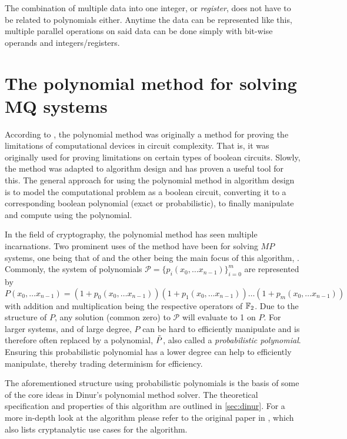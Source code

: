 The combination of multiple data into one integer, or \textit{register}, does not have to be related to polynomials either. Anytime the data can be represented like this, multiple parallel operations on said data can be done simply with bit-wise operands and integers/registers.

\section{The polynomial method for solving MQ systems} \label{sec:prereq:polymethod}
According to \cite{Williams2014ThePM}, the polynomial method was originally a method for proving the limitations of computational devices in circuit complexity. That is, it was originally used for proving limitations on certain types of boolean circuits. Slowly, the method was adapted to algorithm design and has proven a useful tool for this. The general approach for using the polynomial method in algorithm design is to model the computational problem as a boolean circuit, converting it to a corresponding boolean polynomial (exact or probabilistic), to finally manipulate and compute using the polynomial. 

In the field of cryptography, the polynomial method has seen multiple incarnations. Two prominent uses of the method have been for solving $MP$ systems, one being that of \cite{doi:10.1137/1.9781611974782.143} and the other being the main focus of this algorithm, \cite{eurocrypt-2021-30841}. Commonly, the system of polynomials $\mathcal{P} = \{p_i(x_0, \dots x_{n - 1})\}_{i = 0}^m$ are represented by 
$$
    P(x_0, \dots x_{n - 1}) = (1 + p_0(x_0, \dots x_{n - 1}))(1 + p_1(x_0, \dots x_{n - 1})) \dots (1 + p_m(x_0, \dots x_{n - 1}))
$$
with addition and multiplication being the respective operators of $\mathbb{F}_2$. Due to the structure of $P$, any solution (common zero) to $\mathcal{P}$ will evaluate to 1 on $P$. For larger systems, and of large degree, $P$ can be hard to efficiently manipulate and is therefore often replaced by a polynomial, $\Tilde{P}$, also called a \textit{probabilistic polynomial}. Ensuring this probabilistic polynomial has a lower degree can help to efficiently manipulate, thereby trading determinism for efficiency.

The aforementioned structure using probabilistic polynomials is the basis of some of the core ideas in Dinur's polynomial method solver. The theoretical specification and properties of this algorithm are outlined in \cref{sec:dinur}. For a more in-depth look at the algorithm please refer to the original paper in \cite{eurocrypt-2021-30841}, which also lists cryptanalytic use cases for the algorithm.

